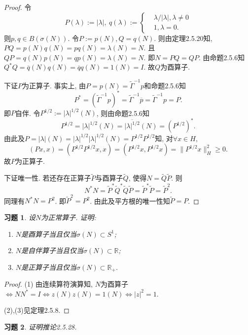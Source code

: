 \documentclass[UTF8,twoside]{ctexbook}
\newtheorem{exercise}{习题}[section]
\newcommand{\kx}{\mathbb}
\numberwithin{equation}{section}
\begin{document}
	\begin{proof}
		令
		\[
		P(\lambda):=|\lambda|,\
		q(\lambda):=\left\{
		\begin{aligned}
		&\lambda/|\lambda|, \lambda \neq 0\\
		&1,\lambda = 0.
		\end{aligned}
		\right.
		\]
		则$p,q\in B(\sigma(N))$. 令$P:=p(N),Q=q(N)$. 则由定理2.5.20知, $PQ=p(N)q(N)=pq(N)=\lambda(N)=N$. 且$QP=q(N)p(N)=qp(N)=\lambda(N)=N$. 即$N=PQ=QP$. 由命题2.5.6知$Q^*Q=\overline{q}(N)q(N)=\overline q q(N)=1(N)=I$. 故$Q$为酉算子.

		下证$P$为正算子. 事实上, 由$P=p(N)=\widetilde{\Gamma}^{-1}p$和命题2.5.6知
		\[
		P^*=(\widetilde \Gamma^{-1}p)^*=\widetilde\Gamma^{-1}\overline p=\widetilde\Gamma^{-1}p=P.
		\]
		即$P$自伴. 令$P^{1/2}:=|\lambda|^{1/2}(N)$, 则由命题2.5.6知
		\[
		P^{1/2}=|\lambda|^{1/2}(N)=\overline{|\lambda|^{1/2}}(N)=(P^{1/2})^*.
		\]
		由此及$P=|\lambda|(N)=|\lambda|^{1/2}|\lambda|^{1/2}(N)=P^{1/2}P^{1/2}$知, 对$\forall x\in H$,
		\[
		(Px,x)=(P^{1/2}P^{1/2}x,x)=(P^{1/2}x,P^{1/2}x)=\|P^{1/2}x\|_H^2\geq 0.
		\]
		故$P$为正算子.

		下证唯一性. 若还存在正算子$\widetilde P$与酉算子$\widetilde Q$, 使得$N=\widetilde Q\widetilde P$. 则
		\[
		N^*N=\widetilde P^*\widetilde Q^*\widetilde Q\widetilde P=\widetilde P^*\widetilde P=\widetilde P^2.
		\]
		同理有$N^*N=P^2$. 即$\widetilde P^2=P^2$. 由此及平方根的唯一性知$\widetilde P=P$.
	\end{proof}
	\begin{exercise}
		设$N$为正常算子. 证明:
		\begin{enumerate}[(1)]
			\item$N$是酉算子当且仅当$\sigma(N)\subset S^1$;
			\item$N$是自伴算子当且仅当$\sigma(N)\subset\kx R$;
			\item$N$是正算子当且仅当$\sigma(N)\subset \kx R_+$.
		\end{enumerate}
	\end{exercise}
	\begin{proof}
		(1) 由连续算符演算知, $N$为酉算子$\Leftrightarrow NN^*=I \Leftrightarrow z(N)z(N)=1(N)\Leftrightarrow |z|^2=1$.

		(2),(3)见定理2.5.8.
	\end{proof}
	\begin{exercise}
		证明推论2.5.28.
	\end{exercise}
\end{document}
